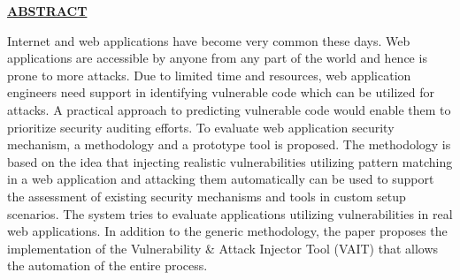 {\centering
        
        {\large \textbf{\underline{ABSTRACT}}}
        \\[4\baselineskip]
        }
        {\normalsize Internet and web applications have become very common these days. Web applications are accessible by anyone from any part of the world and hence is prone to more attacks. Due to limited time and resources, web application engineers need support in identifying vulnerable code which can be utilized for attacks. A practical approach to predicting vulnerable code would enable them to prioritize security auditing efforts. To evaluate web application security mechanism, a methodology and a prototype tool is proposed. The
       	methodology is based on the idea that injecting realistic vulnerabilities utilizing pattern matching in a web application and attacking them automatically can be
       	used to support the assessment of existing security mechanisms and tools in custom setup scenarios. The system tries to evaluate applications utilizing vulnerabilities in real web applications.
       	In addition to the generic methodology, the paper proposes the implementation of the Vulnerability \& Attack Injector Tool (VAIT) that
       	allows the automation of the entire process.
        	

        }